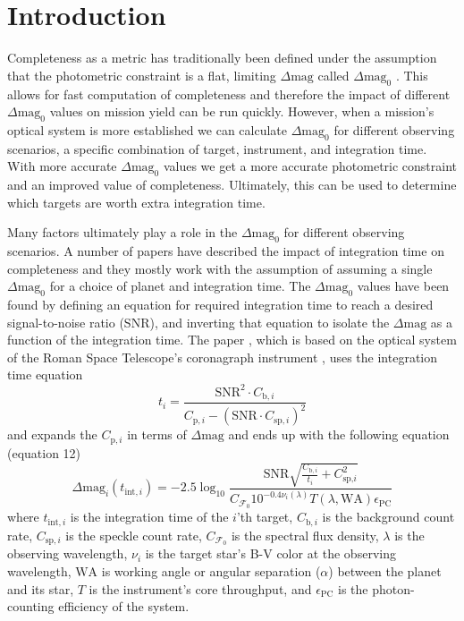 \section{Introduction}%
\label{sec:ch2_intro}

Completeness as a metric has traditionally been defined under the assumption
that the photometric constraint is a flat, limiting $\Delta\textrm{mag}$ called
$\Delta\textrm{mag}_0$ \citep{brownSingleVisitPhotometric2005}. This allows for
fast computation of completeness and therefore the impact of different
$\Delta\textrm{mag}_0$ values on mission yield can be run quickly. However,
when a mission's optical system is more established we can calculate
$\Delta\textrm{mag}_0$ for different observing scenarios, a specific
combination of target, instrument, and integration time. With more accurate
$\Delta\textrm{mag}_0$ values we get a more accurate photometric constraint and
an improved value of completeness. Ultimately, this can be used to determine
which targets are worth extra integration time.

Many factors ultimately play a role in the $\Delta\textrm{mag}_0$ for different
observing scenarios. A number of papers have described the impact of
integration time on completeness \citep{hunyadiSingleVisitCompleteness2005,
  brownNewCompletenessMethods2010, starkMaximizingExoEarthCandidate2014,
keithlyOptimalScheduling2020} and they mostly work with the assumption of
assuming a single $\Delta\textrm{mag}_0$ for a choice of planet and integration
time. The $\Delta\textrm{mag}_0$ values have been found by defining an equation
for required integration time to reach a desired signal-to-noise ratio (SNR),
and inverting that equation to isolate the $\Delta\textrm{mag}$ as a function
of the integration time. The paper \citet{keithlyOptimalScheduling2020}, which
is based on the optical system of the Roman Space Telescope's coronagraph
instrument \citep{Nemati2014}, uses the integration time equation
\begin{equation}
  t_i = \frac{\textrm{SNR}^2 \cdot C_{\textrm{b}, i}}{C_{\textrm{p}, i} - \left( \textrm{SNR} \cdot C_{\textrm{sp},i} \right)^2}
  \label{eq:dean_inttime}
\end{equation}
and expands the $C_{\textrm{p}, i}$ in terms of $\Delta\textrm{mag}$ and ends
up with the following equation (equation 12)
\begin{equation}
  \Delta\textrm{mag}_i(t_{\textrm{int},i}) = -2.5 \log_10 \frac{\textrm{SNR} \sqrt{\frac{C_{\textrm{b},
  i}}{t_i} + C_{\textrm{sp,}i}^2}}{C_{\mathcal{F}_0} 10^{-0.4 \nu_i (\lambda)}
T(\lambda, \textrm{WA}) \epsilon_{\textrm{PC}}}
  \label{eq:dean_dmag}
\end{equation}
where $t_{\textrm{int},i}$ is the integration time of the $i$'th target,
$C_{\textrm{b},i}$ is the background count rate,
$C_{\textrm{sp},i}$ is the speckle count rate,
$C_{\mathcal{F}_0}$ is the spectral flux density,
$\lambda$ is the observing wavelength,
$\nu_i$ is the target star's B-V color at the observing wavelength,
$\textrm{WA}$ is working angle or angular separation ($\alpha$) between the planet and its star,
$T$ is the instrument's core throughput,
and $\epsilon_{\textrm{PC}}$ is the photon-counting efficiency of the system.

